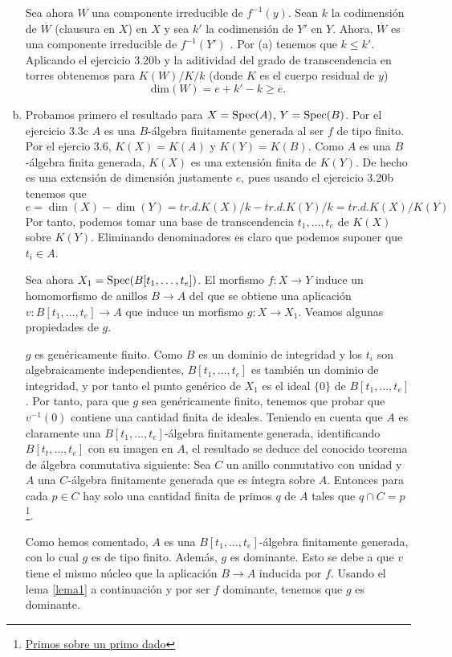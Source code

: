 \documentclass[twoside]{article}
\begin{document}
\begin{solucion}
\begin{enumerate}[(a)]
Sea ahora $W$ una componente irreducible de $f^{-1}(y)$. Sean $k$ la codimensión de $\overline{W}$ (clausura en $X$) en $X$ y sea $k'$ la codimensión de $Y'$ en $Y$. Ahora, $\overline{W}$ es una componente irreducible de $f^{-1}(Y')$ . Por (a) tenemos que $k\leq k'$. Aplicando el ejercicio 3.20b y la aditividad del grado de transcendencia en torres obtenemos para $K(W)/K/k$ (donde $K$ es el cuerpo residual de $y$)
\[
\text{dim}(W)=e+k'-k \geq e.
\]
\item Probamos primero el resultado para $X=\operatorname{Spec}(A)$, $Y=\operatorname{Spec}(B)$. Por el ejercicio 3.3c $A$ es una $B$-álgebra finitamente generada al ser $f$ de tipo finito. Por el ejercio 3.6, $K(X)=K(A)$ y $K(Y)=K(B)$. Como $A$ es una $B$-álgebra finita generada, $K(X)$ es una extensión finita de $K(Y)$. De hecho es una extensión de dimensión justamente $e$, pues usando el ejercicio 3.20b tenemos que
\[
e=\dim(X)-\dim(Y)=tr.d. K(X)/k-tr.d. K(Y)/k=tr.d. K(X)/K(Y)
\]
Por tanto, podemos tomar una base de transcendencia $t_1,\dots, t_e$ de $K(X)$ sobre $K(Y)$. Eliminando denominadores es claro que podemos suponer que $t_i\in A$. 

Sea ahora $X_1=\operatorname{Spec}(B[t_1,\dots, t_e])$. El morfismo $f:X\to Y$ induce un homomorfismo de anillos $B\to A$ del que se obtiene una aplicación $v:B[t_1,\dots, t_e]\to A$ que induce un morfismo $g:X\to X_1$. Veamos algunas propiedades de $g$.

$g$ es genéricamente finito. Como $B$ es un dominio de integridad y los $t_i$ son algebraicamente independientes, $B[t_1,\dots, t_e]$ es también un dominio de integridad, y por tanto el punto genérico de $X_1$ es el ideal $\{0\}$ de $B[t_1,\dots, t_e]$. Por tanto, para que $g$ sea genéricamente finito, tenemos que probar que $v^{-1}(0)$ contiene una cantidad finita de ideales. Teniendo en cuenta que $A$ es claramente una $B[t_1,\dots, t_e]$-álgebra finitamente generada, identificando $B[t_t,\dots, t_e]$ con su imagen en $A$, el resultado se deduce del conocido teorema de álgebra conmutativa siguiente: Sea $C$ un anillo conmutativo con unidad y $A$ una $C$-álgebra finitamente generada que es íntegra sobre $A$. Entonces para cada $p\in C$ hay solo una cantidad finita de primos $q$ de $A$ tales que $q\cap C=p$\footnote{\href{https://math.stackexchange.com/questions/753042/finitely-many-prime-ideals-lying-over-mathfrakp}{Primos sobre un primo dado}}.

Como hemos comentado, $A$ es una $B[t_1,\dots, t_e]$-álgebra finitamente generada, con lo cual $g$ es de tipo finito. Además, $g$ es dominante. Esto se debe a que $v$ tiene el mismo núcleo que la aplicación $B\to A$ inducida por $f$. Usando el lema \ref{lema1} a continuación y por ser $f$ dominante, tenemos que $g$ es dominante. 


\end{enumerate}
\end{solucion}
\end{document}
